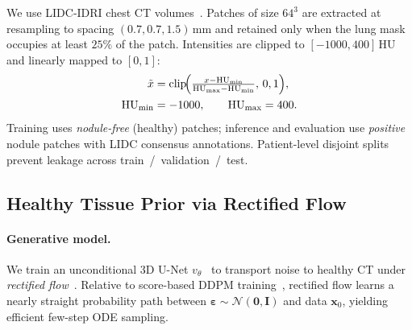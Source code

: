 \documentclass[twoside]{article}
\begin{document}
We use LIDC-IDRI chest CT volumes~\cite{lidc2011}.
Patches of size \(64^{3}\) are extracted at resampling to spacing
\((0.7,0.7,1.5)\,\mathrm{mm}\) and retained only when the lung mask occupies at
least \(25\%\) of the patch.
Intensities are clipped to \([-1000,400]\,\mathrm{HU}\) and linearly mapped to
\([0,1]\):
\begin{equation}
\begin{aligned}
\tilde{x}
&=
\mathrm{clip}\!\Bigl(
\tfrac{x - \mathrm{HU}_{\min}}{\mathrm{HU}_{\max}-\mathrm{HU}_{\min}},\,0,1
\Bigr),\\
\mathrm{HU}_{\min}&=-1000,\qquad
\mathrm{HU}_{\max}=400.
\end{aligned}
\end{equation}
Training uses \emph{nodule-free} (healthy) patches; inference and evaluation use
\emph{positive} nodule patches with LIDC consensus annotations.
Patient-level disjoint splits prevent leakage across train~/~validation~/~test.

\subsection{Healthy Tissue Prior via Rectified Flow}
\label{sec:method:rflow}

\paragraph{Generative model.}
We train an unconditional 3D U-Net \(v_\theta\)~\cite{ronneberger2015unet}
to transport noise to healthy CT under
\emph{rectified flow}~\cite{liu2023flow,lipman2023flowmatching}.
Relative to score-based DDPM training~\cite{ho2020ddpm}, rectified flow learns a nearly straight
probability path between \(\boldsymbol{\varepsilon}\sim\mathcal{N}(\mathbf{0},\mathbf{I})\)
and data \(\mathbf{x}_0\), yielding efficient few-step ODE sampling.
\end{document}
